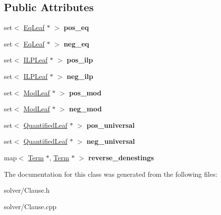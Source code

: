 \subsection*{\-Public \-Attributes}
\begin{DoxyCompactItemize}
\item 
\hypertarget{classClause_adadc497c5bbdb64f2978fad4db613ff0}{set$<$ \hyperlink{classEqLeaf}{\-Eq\-Leaf} $\ast$ $>$ {\bfseries pos\-\_\-eq}}\label{classClause_adadc497c5bbdb64f2978fad4db613ff0}

\item 
\hypertarget{classClause_a7ff2197334cae1e18d3fba03001577d0}{set$<$ \hyperlink{classEqLeaf}{\-Eq\-Leaf} $\ast$ $>$ {\bfseries neg\-\_\-eq}}\label{classClause_a7ff2197334cae1e18d3fba03001577d0}

\item 
\hypertarget{classClause_a1e26ec2f623668688f37ca16324b2d07}{set$<$ \hyperlink{classILPLeaf}{\-I\-L\-P\-Leaf} $\ast$ $>$ {\bfseries pos\-\_\-ilp}}\label{classClause_a1e26ec2f623668688f37ca16324b2d07}

\item 
\hypertarget{classClause_af4a320a17a612b8120289fb3e18a9149}{set$<$ \hyperlink{classILPLeaf}{\-I\-L\-P\-Leaf} $\ast$ $>$ {\bfseries neg\-\_\-ilp}}\label{classClause_af4a320a17a612b8120289fb3e18a9149}

\item 
\hypertarget{classClause_a98ea135fa9c9a15f968f24c0cdcdd0f7}{set$<$ \hyperlink{classModLeaf}{\-Mod\-Leaf} $\ast$ $>$ {\bfseries pos\-\_\-mod}}\label{classClause_a98ea135fa9c9a15f968f24c0cdcdd0f7}

\item 
\hypertarget{classClause_a5c718ef3a32ccd15a8b21386a75e5ce8}{set$<$ \hyperlink{classModLeaf}{\-Mod\-Leaf} $\ast$ $>$ {\bfseries neg\-\_\-mod}}\label{classClause_a5c718ef3a32ccd15a8b21386a75e5ce8}

\item 
\hypertarget{classClause_a96bf796b56ff0bc9213292973366be52}{set$<$ \hyperlink{classQuantifiedLeaf}{\-Quantified\-Leaf} $\ast$ $>$ {\bfseries pos\-\_\-universal}}\label{classClause_a96bf796b56ff0bc9213292973366be52}

\item 
\hypertarget{classClause_a64f7177e40c247d49fd7515dcc5e47d1}{set$<$ \hyperlink{classQuantifiedLeaf}{\-Quantified\-Leaf} $\ast$ $>$ {\bfseries neg\-\_\-universal}}\label{classClause_a64f7177e40c247d49fd7515dcc5e47d1}

\item 
\hypertarget{classClause_ae8c2e0ecbfdab63b1aeab80429eadd55}{map$<$ \hyperlink{classTerm}{\-Term} $\ast$, \hyperlink{classTerm}{\-Term} $\ast$ $>$ {\bfseries reverse\-\_\-denestings}}\label{classClause_ae8c2e0ecbfdab63b1aeab80429eadd55}

\end{DoxyCompactItemize}


\-The documentation for this class was generated from the following files\-:\begin{DoxyCompactItemize}
\item 
solver/\-Clause.\-h\item 
solver/\-Clause.\-cpp\end{DoxyCompactItemize}
